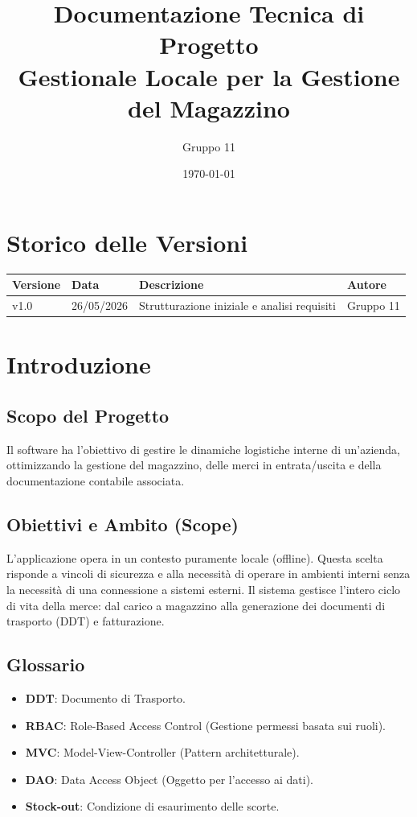 \documentclass[a4paper,12pt]{article}
\title{Documentazione Tecnica di Progetto \\ \large Gestionale Locale per la Gestione del Magazzino}
\author{Gruppo 11}
\date{\today}
\begin{document}
\maketitle

\section*{Storico delle Versioni}
\begin{center}
\begin{tabular}{llll}
\toprule
\textbf{Versione} & \textbf{Data} & \textbf{Descrizione} & \textbf{Autore} \\
\midrule
v1.0 & 26/05/2026 & Strutturazione iniziale e analisi requisiti & Gruppo 11 \\
\bottomrule
\end{tabular}
\end{center}

\newpage
\tableofcontents
\newpage

\section{Introduzione}
\subsection{Scopo del Progetto}
Il software ha l'obiettivo di gestire le dinamiche logistiche interne di un'azienda, ottimizzando la gestione del magazzino, delle merci in entrata/uscita e della documentazione contabile associata.

\subsection{Obiettivi e Ambito (Scope)}
L'applicazione opera in un contesto puramente locale (offline). Questa scelta risponde a vincoli di sicurezza e alla necessità di operare in ambienti interni senza la necessità di una connessione a sistemi esterni. Il sistema gestisce l'intero ciclo di vita della merce: dal carico a magazzino alla generazione dei documenti di trasporto (DDT) e fatturazione.

\subsection{Glossario}
\begin{itemize}
    \item \textbf{DDT}: Documento di Trasporto.
    \item \textbf{RBAC}: Role-Based Access Control (Gestione permessi basata sui ruoli).
    \item \textbf{MVC}: Model-View-Controller (Pattern architetturale).
    \item \textbf{DAO}: Data Access Object (Oggetto per l'accesso ai dati).
    \item \textbf{Stock-out}: Condizione di esaurimento delle scorte.
\end{itemize}
\end{document}
